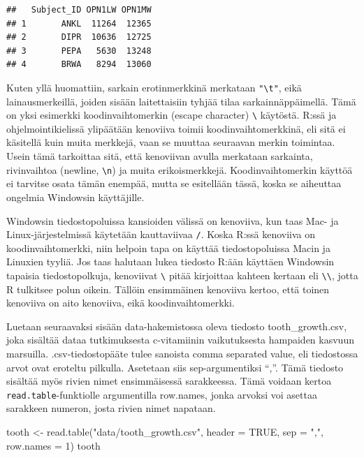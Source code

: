 \documentclass[
]{book}
\newenvironment{Shaded}{\begin{snugshade}}{\end{snugshade}}
\newcommand{\AttributeTok}[1]{\textcolor[rgb]{0.77,0.63,0.00}{#1}}
\newcommand{\ConstantTok}[1]{\textcolor[rgb]{0.00,0.00,0.00}{#1}}
\newcommand{\DecValTok}[1]{\textcolor[rgb]{0.00,0.00,0.81}{#1}}
\newcommand{\FunctionTok}[1]{\textcolor[rgb]{0.00,0.00,0.00}{#1}}
\newcommand{\NormalTok}[1]{#1}
\newcommand{\OtherTok}[1]{\textcolor[rgb]{0.56,0.35,0.01}{#1}}
\newcommand{\StringTok}[1]{\textcolor[rgb]{0.31,0.60,0.02}{#1}}
\begin{document}
\begin{verbatim}
##   Subject_ID OPN1LW OPN1MW
## 1       ANKL  11264  12365
## 2       DIPR  10636  12725
## 3       PEPA   5630  13248
## 4       BRWA   8294  13060
\end{verbatim}

Kuten yllä huomattiin, sarkain erotinmerkkinä merkataan \texttt{"\textbackslash{}t"}, eikä lainausmerkeillä, joiden sisään laitettaisiin tyhjää tilaa sarkainnäppäimellä. Tämä on yksi esimerkki koodinvaihtomerkin (escape character) \texttt{\textbackslash{}} käytöstä. R:ssä ja ohjelmointikielissä ylipäätään kenoviiva toimii koodinvaihtomerkkinä, eli sitä ei käsitellä kuin muita merkkejä, vaan se muuttaa seuraavan merkin toimintaa. Usein tämä tarkoittaa sitä, että kenoviivan avulla merkataan sarkainta, rivinvaihtoa (newline, \texttt{\textbackslash{}n}) ja muita erikoismerkkejä. Koodinvaihtomerkin käyttöä ei tarvitse osata tämän enempää, mutta se esitellään tässä, koska se aiheuttaa ongelmia Windowsin käyttäjille.

Windowsin tiedostopoluissa kansioiden välissä on kenoviiva, kun taas Mac- ja Linux-järjestelmissä käytetään kauttaviivaa \texttt{/}. Koska R:ssä kenoviiva on koodinvaihtomerkki, niin helpoin tapa on käyttää tiedostopoluissa Macin ja Linuxien tyyliä. Jos taas halutaan lukea tiedosto R:ään käyttäen Windowsin tapaisia tiedostopolkuja, kenoviivat \texttt{\textbackslash{}} pitää kirjoittaa kahteen kertaan eli \texttt{\textbackslash{}\textbackslash{}}, jotta R tulkitsee polun oikein. Tällöin ensimmäinen kenoviiva kertoo, että toinen kenoviiva on aito kenoviiva, eikä koodinvaihtomerkki.

Luetaan seuraavaksi sisään data-hakemistossa oleva tiedosto tooth\_growth.csv, joka sisältää dataa tutkimuksesta c-vitamiinin vaikutuksesta hampaiden kasvuun marsuilla. .csv-tiedostopääte tulee sanoista comma separated value, eli tiedostossa arvot ovat eroteltu pilkulla. Asetetaan siis sep-argumentiksi ``,''. Tämä tiedosto sisältää myös rivien nimet ensimmäisessä sarakkeessa. Tämä voidaan kertoa \texttt{read.table}-funktiolle argumentilla row.names, jonka arvoksi voi asettaa sarakkeen numeron, josta rivien nimet napataan.

\begin{Shaded}
\begin{Highlighting}[]
\NormalTok{tooth }\OtherTok{\textless{}{-}} \FunctionTok{read.table}\NormalTok{(}\StringTok{"data/tooth\_growth.csv"}\NormalTok{, }\AttributeTok{header =} \ConstantTok{TRUE}\NormalTok{, }\AttributeTok{sep =} \StringTok{","}\NormalTok{, }\AttributeTok{row.names =} \DecValTok{1}\NormalTok{)}
\NormalTok{tooth}
\end{Highlighting}
\end{Shaded}
\end{document}
